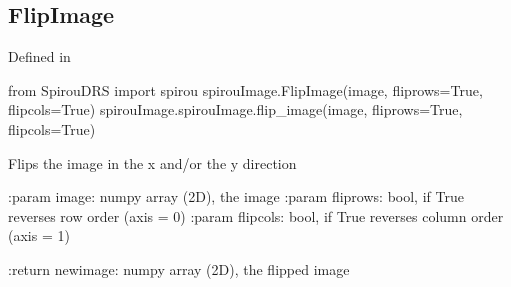 \begin{minipage}{\textwidth}
\subsection{FlipImage}

Defined in \spirouImage{}

\begin{pythonbox}
from SpirouDRS import spirou
spirouImage.FlipImage(image, fliprows=True, flipcols=True)
spirouImage.spirouImage.flip_image(image, fliprows=True, flipcols=True)
\end{pythonbox}

\begin{pythondocstring}
Flips the image in the x and/or the y direction

:param image: numpy array (2D), the image
:param fliprows: bool, if True reverses row order (axis = 0)
:param flipcols: bool, if True reverses column order (axis = 1)

:return newimage: numpy array (2D), the flipped image
\end{pythondocstring}
\end{minipage}


